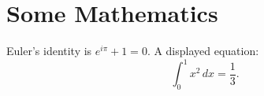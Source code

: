 \section{Some Mathematics}
Euler's identity is $e^{i\pi} + 1 = 0$. A displayed equation:
\begin{equation}
  \int_0^1 x^2 \, dx = \frac{1}{3}.
\end{equation}
